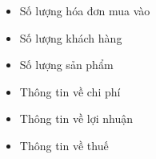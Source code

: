 \begin{itemize}
\begin{itemize}
\item Số lượng hóa đơn mua vào

\item Số lượng khách hàng

\item Số lượng sản phẩm

\item Thông tin về chi phí

\item Thông tin về lợi nhuận

\item Thông tin về thuế

\end{itemize}

\end{itemize}
















